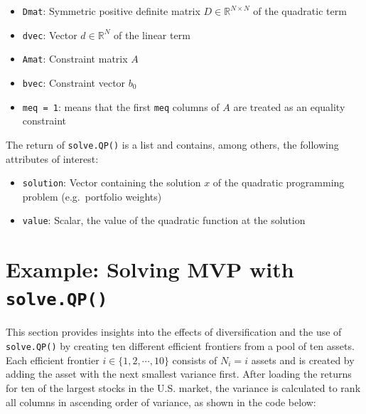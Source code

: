 \documentclass[
  oneside]{book}
\providecommand{\tightlist}{%
  \setlength{\itemsep}{0pt}\setlength{\parskip}{0pt}}
\begin{document}
\vspace{-0.4cm}

\begin{itemize}
\tightlist
\item
  \texttt{Dmat}: Symmetric positive definite matrix \(D \in \mathbb{R}^{N \times N}\) of the quadratic term
\item
  \texttt{dvec}: Vector \(d \in \mathbb{R}^{N}\) of the linear term
\item
  \texttt{Amat}: Constraint matrix \(A\)
\item
  \texttt{bvec}: Constraint vector \(b_0\)
\item
  \texttt{meq\ =\ 1}: means that the first \texttt{meq} columns of \(A\) are treated as an equality constraint
\end{itemize}

The return of \texttt{solve.QP()} is a list and contains, among others, the following attributes of interest:

\vspace{-0.4cm}

\begin{itemize}
\tightlist
\item
  \texttt{solution}: Vector containing the solution \(x\) of the quadratic programming problem (e.g.~portfolio weights)
\item
  \texttt{value}: Scalar, the value of the quadratic function at the solution
\end{itemize}

\hypertarget{exampleanalyticalmvp}{%
\section{\texorpdfstring{Example: Solving MVP with \texttt{solve.QP()}}{Example: Solving MVP with solve.QP()}}\label{exampleanalyticalmvp}}

This section provides insights into the effects of diversification and the use of \texttt{solve.QP()} by creating ten different efficient frontiers from a pool of ten assets. Each efficient frontier \(i \in \{1, 2, \cdots, 10\}\) consists of \(N_i = i\) assets and is created by adding the asset with the next smallest variance first. After loading the returns for ten of the largest stocks in the U.S. market, the variance is calculated to rank all columns in ascending order of variance, as shown in the code below:
\end{document}
